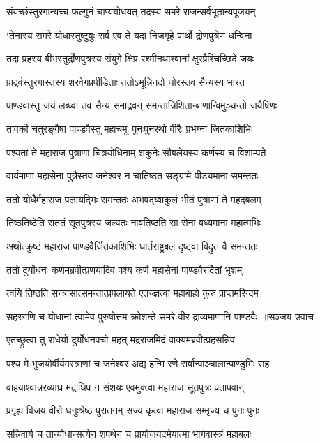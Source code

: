 \twolineshloka
{संयच्छंस्तुरगान्यच्च फल्गुनं चाप्ययोधयत्}
{तदस्य समरे राजन्सर्वभूतान्यपूजयन्}


\twolineshloka
{`तेनास्य समरे योधास्तुष्टुवुः सर्व एव ते}
{यदा निजगृहे पार्थो द्रोणपुत्रेण धन्विना}


\twolineshloka
{तदा प्रहस्य बीभस्तुर्द्रोणपुत्रस्य संयुगे}
{क्षिप्रं रश्मीनथाश्वानां क्षुरप्रैश्चिच्छिदे जयः}


\twolineshloka
{प्राद्रवंस्तुरगास्तस्य शरवेगप्रपीडिताः}
{ततोऽभून्निनदो घोरस्तव सैन्यस्य भारत}


\twolineshloka
{पाण्डवास्तु जयं लब्ध्वा तव सैन्यं समाद्रवन्}
{समन्तान्निशितान्बाणान्विमुञ्चन्तो जयैषिणः}


\twolineshloka
{तावकी चतुरङ्गैषा पाण्डवैस्तु महाचमूः}
{पुनःपुनरथो वीरैः प्रभग्ना जितकाशिभिः}


\twolineshloka
{पश्यतां ते महाराज पुत्राणां चित्रयोधिनाम्}
{शकुनेः सौबलेयस्य कर्णस्य च विशाम्पते}


\twolineshloka
{वार्यमाणा महासेना पुत्रैस्तव जनेश्वर}
{न चातिष्ठत सङ्ग्रामे पीड्यमाना समन्ततः}


\twolineshloka
{ततो योधैर्महाराज पलायद्भिः समन्ततः}
{अभवद्य्वाकुलं भीतं पुत्राणां ते महद्बलम्}


\twolineshloka
{तिष्ठतिष्ठेति सततं सूतपुत्रस्य जल्पतः}
{नावतिष्ठति सा सेना वध्यमाना महात्मभिः}


\twolineshloka
{अथोत्क्रुष्टं महाराज पाण्डवैर्जितकाशिभिः}
{धार्तराष्ट्रबलं दृष्ट्वा विद्रुतं वै समन्ततः}


\twolineshloka
{ततो दुर्योधनः कर्णमब्रवीत्प्रणयादिव}
{पश्य कर्ण महासेनां पाण्डवैरर्दितां भृशम्}


\twolineshloka
{त्वयि तिष्ठति सन्त्रासात्समन्तात्प्रपलायते}
{एतज्ज्ञत्वा महाबाहो कुरु प्राप्तमरिन्दम}


\threelineshloka
{सहस्राणि च योधानां त्वामेव पुरुषोत्तम}
{क्रोशन्ते समरे वीर द्राव्यमाणानि पाण्डवैः ॥सञ्जय उवाच}
{}


\twolineshloka
{एतच्छ्रुत्वा तु राधेयो दुर्योधनवचो महत्}
{मद्रराजमिदं वाक्यमब्रवीत्प्रहसन्निव}


\twolineshloka
{पश्य मे भुजयोर्वीर्यमस्त्राणां च जनेश्वर}
{अद्य हन्मि रणे सर्वान्पाञ्चालान्पाण्डुभिः सह}


\twolineshloka
{वाहयाश्वान्नरव्याघ्र मद्राधिप न संशयः}
{एवमुक्त्वा महाराज सूतपुत्रः प्रतापवान्}


\twolineshloka
{प्रगृह्य विजयं वीरो धनुःश्रेष्ठं पुरातनम्}
{सज्यं कृत्वा महाराज सम्मृज्य च पुनः पुनः}


\twolineshloka
{सन्निवार्य च तान्योधान्सत्येन शपथेन च}
{प्रायोजयदमेयात्मा भार्गवास्त्रं महाबलः}


